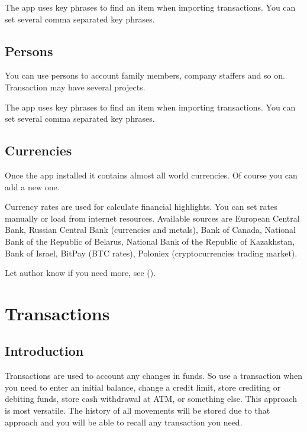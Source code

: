 \documentclass[a4paper,10pt,english]{sphinxmanual}
\begin{document}
The app uses key phrases to find an item when importing transactions. You can set several
comma separated key phrases.


\section{Persons}
\label{\detokenize{directories:persons}}
You can use persons to account family members, company staffers and so on.
Transaction may have several projects.

The app uses key phrases to find an item when importing transactions. You can set several
comma separated key phrases.

\noindent{}
\noindent{}
\noindent{}


\section{Currencies}
\label{\detokenize{directories:currencies}}
Once the app installed it contains almost all world currencies. Of course you can add a new one.

Currency rates are used for calculate financial highlights. You can set rates manually
or load from internet resources. Available sources are European Central Bank,
Russian Central Bank (currencies and metals), Bank of Canada, National Bank of the Republic of Belarus,
National Bank of the Republic of Kazakhstan, Bank of Israel, BitPay (BTC rates), Poloniex (cryptocurrencies trading market).

Let author know if you need more, see {\hyperref[\detokenize{preface:section-feedback}]{}} ().


\chapter{Transactions}
\label{\detokenize{transactions:transactions}}\label{\detokenize{transactions:chapter-transactions}}\label{\detokenize{transactions::doc}}

\section{Introduction}
\label{\detokenize{transactions:introduction}}
Transactions are used to account any changes in funds. So use a transaction when you need to
enter an initial balance, change a credit limit, store crediting or debiting funds,
store cash withdrawal at ATM, or something else. This approach is most versatile. The history of
all movements will be stored due to that approach and you will be able to recall any transaction
you need.
\end{document}
